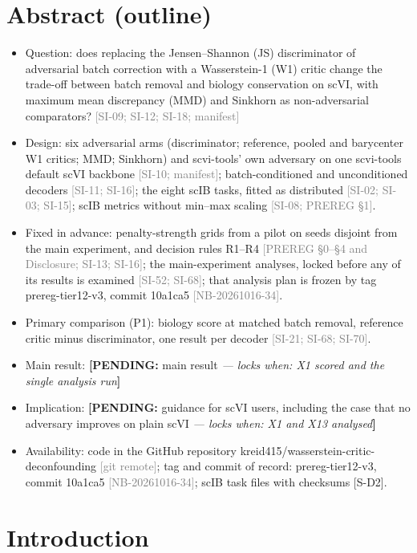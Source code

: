 \documentclass[11pt]{article}
\newcommand{\src}[1]{{\scriptsize\textcolor{gray}{[#1]}}}
\newcommand{\pending}[2]{{\color{BurntOrange}\textbf{[PENDING:} #1 \textit{--- locks when: #2}\textbf{]}}}
\begin{document}
\section*{Abstract (outline)}
\begin{itemize}
\item Question: does replacing the Jensen--Shannon (JS) discriminator of adversarial batch correction with a Wasserstein-1 (W1) critic change the trade-off between batch removal and biology conservation on scVI, with maximum mean discrepancy (MMD) and Sinkhorn as non-adversarial comparators? \src{SI-09; SI-12; SI-18; manifest}
\item Design: six adversarial arms (discriminator; reference, pooled and barycenter W1 critics; MMD; Sinkhorn) and scvi-tools' own adversary on one scvi-tools default scVI backbone \src{SI-10; manifest}; batch-conditioned and unconditioned decoders \src{SI-11; SI-16}; the eight scIB tasks, fitted as distributed \src{SI-02; SI-03; SI-15}; scIB metrics without min--max scaling \src{SI-08; PREREG \S1}.
\item Fixed in advance: penalty-strength grids from a pilot on seeds disjoint from the main experiment, and decision rules R1--R4 \src{PREREG \S0--\S4 and Disclosure; SI-13; SI-16}; the main-experiment analyses, locked before any of its results is examined \src{SI-52; SI-68}; that analysis plan is frozen by tag prereg-tier12-v3, commit 10a1ca5 \src{NB-20261016-34}.
\item Primary comparison (P1): biology score at matched batch removal, reference critic minus discriminator, one result per decoder \src{SI-21; SI-68; SI-70}.
\item Main result: \pending{main result}{X1 scored and the single analysis run}
\item Implication: \pending{guidance for scVI users, including the case that no adversary improves on plain scVI}{X1 and X13 analysed}
\item Availability: code in the GitHub repository kreid415/wasserstein-critic-deconfounding \src{git remote}; tag and commit of record: prereg-tier12-v3, commit 10a1ca5 \src{NB-20261016-34}; scIB task files with checksums [S-D2].
\end{itemize}

\section{Introduction}\label{sec:intro}
\end{document}
